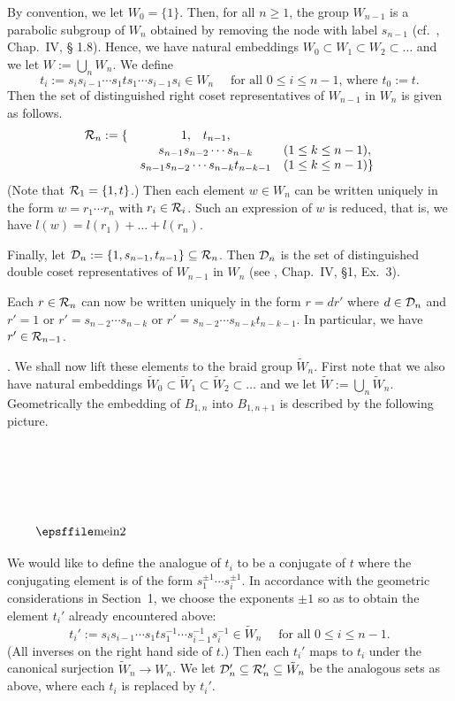  By convention, we let $W_0=\{1\}$. Then, for  all $n \geq 1$, the
group $W_{n-1}$ is a parabolic subgroup  of $W_n$ obtained by removing
the  node  with   label $s_{n-1}$   (cf.\ \cite{Bour}, Chap.\   IV, \S
1.8).  Hence, we have natural  embeddings $W_0 \subset W_1 \subset W_2
\subset \ldots$ and we let $W:=\bigcup_{n} W_n$.  We define
\[t_i:=s_is_{i-1} \cdots s_1ts_1 \cdots s_{i-1}s_i \in W_n \quad
\mbox{ for all $0 \leq i \leq n-1$, where $t_0:=t$}.\] Then the set of distinguished
right  coset representatives of $W_{n-1}$ in $W_n$ is given as follows.
\[ \begin{array}{lcl}
{\cal R}_n:=\{ & 1,\;\;\; t_{n-1}, & \\
         & s_{n-1}s_{n-2} \cdots s_{n-k} & (1 \leq k \leq n-1), \\
         & s_{n-1}s_{n-2} \cdots s_{n-k}t_{n-k-1} & (1 \leq k \leq n-1)\}\\
\end{array}\]
(Note that ${\cal R}_1=\{1,t\}$.) Then each element $w \in W_n$ can be
written uniquely in  the form $w=r_1 \cdots  r_n$ with  $r_i \in {\cal
R}_i$.   Such an   expression  of $w$  is  reduced, that  is,  we have
$l(w)=l(r_1)+\ldots +l(r_n)$.

Finally,  let   ${\cal  D}_n:=\{1,s_{n-1},  t_{n-1}\}  \subseteq {\cal
R}_n$.  Then ${\cal  D}_n$  is the set  of distinguished  double coset
representatives of $W_{n-1}$ in $W_n$ (see \cite{Bour}, Chap.\ IV, \S 1, 
Ex.\ 3).

Each  $r  \in {\cal R}_n$  can  now be written  uniquely   in the form
$r=dr'$ where   $d \in {\cal  D}_n$  and  $r'=1$  or $r'=s_{n-2}\cdots
s_{n-k}$ or $r'=s_{n-2} \cdots s_{n-k}t_{n-k-1}$. In particular, we
have $r' \in {\cal R}_{n-1}$.


.  We   shall  now lift these elements to the   braid  group
$\tilde{W}_n$.  First  note   that we also     have natural embeddings
$\tilde{W}_0  \subset \tilde{W}_1 \subset  \tilde{W}_2 \subset \ldots$
and we  let $\tilde{W}:=\bigcup_{n}  \tilde{W}_n$.   Geometrically the
embedding of $B_{1,n}$ into $B_{1,n+1}$  is described by the following
picture.

$$\vbox{\picill3.7inby1.04in(mein2)  }$$   

\noindent We would like to define the analogue of $t_i$ to be a conjugate  
of $t$ where the conjugating element is of the form $s_1^{\pm 1} \cdots
s_i^{\pm 1}$. In accordance with the geometric considerations in Section~1,
we choose the exponents $\pm 1$ so as to obtain the element $t_i'$ 
already encountered above:
\[ t_i':=s_is_{i-1} \cdots s_1ts_1^{-1} \cdots s_{i-1}^{-1}s_i^{-1} 
\in \tilde{W}_n \quad \mbox{ for all $0 \leq i \leq n-1$}.\] 
(All inverses on the right hand side of $t$.) Then each $t_i'$ maps to
$t_i$  under  the canonical surjection $\tilde{W}_n  \rightarrow W_n$.
We  let ${\cal D}_n' \subseteq {\cal  R}_n'  \subseteq \tilde{W}_n$ be
the analogous sets as above, where each $t_i$ is replaced by $t_i'$.

